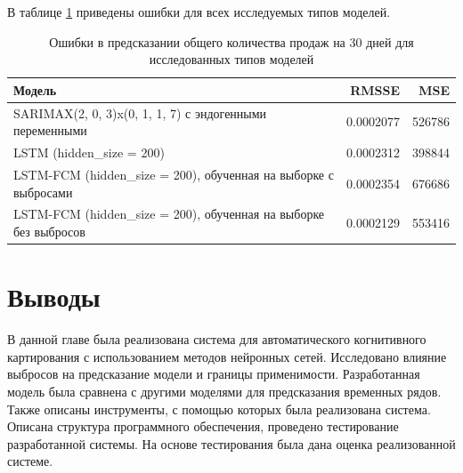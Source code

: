 В таблице \ref{tbl:all_models_comparation} приведены ошибки для всех исследуемых типов моделей.

\begin{table}
    \caption{ Ошибки в предсказании общего количества продаж на 30 дней для исследованных типов моделей }
    \centering
    \begin{tabular}{|l|r||r|}
        \hline
            Модель                                                  & RMSSE    & MSE      \\
        \hline
            SARIMAX(2, 0, 3)x(0, 1, 1, 7) с эндогенными переменными           & 0.0002077 & 526786 \\
            LSTM (hidden\_size = 200)                                         & 0.0002312 & 398844 \\
            LSTM-FCM (hidden\_size = 200), обученная на выборке с выбросами   & 0.0002354 & 676686 \\
            LSTM-FCM (hidden\_size = 200), обученная на выборке без выбросов  & 0.0002129 & 553416 \\
        \hline
    \end{tabular}
    \label{tbl:all_models_comparation}
\end{table}

\section{Выводы}

В данной главе была реализована система для автоматического когнитивного картирования с использованием
методов нейронных сетей. Исследовано влияние выбросов на предсказание модели и границы применимости.
Разработанная модель была сравнена с другими моделями для предсказания временных рядов.
Также описаны инструменты, с помощью которых была реализована система.
Описана структура программного обеспечения, проведено тестирование разработанной системы.
На основе тестирования была дана оценка реализованной системе.



